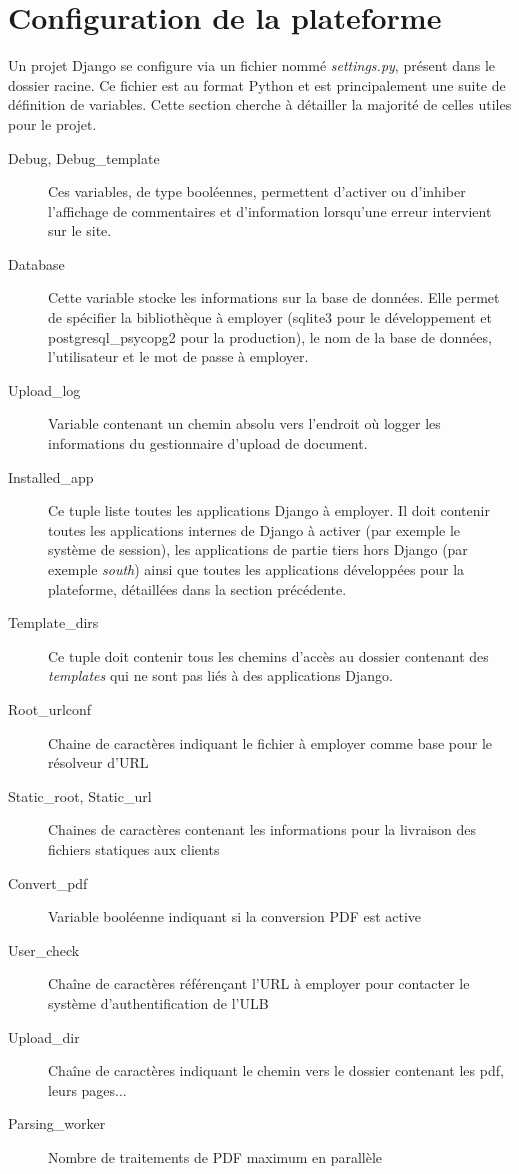 \documentclass[a4paper,12pt]{article}
\begin{document}
\section{Configuration de la plateforme}

Un projet Django se configure via un fichier nommé \textit{settings.py},
présent dans le dossier racine. Ce fichier est au format Python et est principalement
une suite de définition de variables. Cette section cherche à détailler la majorité
de celles utiles pour le projet.

\begin{description}
\item[Debug, Debug\_template] Ces variables, de type booléennes, permettent d'activer
      ou d'inhiber l'affichage de commentaires et d'information lorsqu'une erreur
      intervient sur le site.
\item[Database] Cette variable stocke les informations sur la base de données. Elle
      permet de spécifier la bibliothèque à employer (sqlite3 pour le développement
      et postgresql\_psycopg2 pour la production), le nom de la base de données, l'utilisateur
      et le mot de passe à employer.
\item[Upload\_log] Variable contenant un chemin absolu vers l'endroit où logger
      les informations du gestionnaire d'upload de document.
\item[Installed\_app] Ce tuple liste toutes les applications Django à employer. Il
      doit contenir toutes les applications internes de Django à activer (par exemple
      le système de session), les applications de partie tiers hors Django (par exemple
      \textit{south}) ainsi que toutes les applications développées pour la plateforme,
      détaillées dans la section précédente.
\item[Template\_dirs] Ce tuple doit contenir tous les chemins d'accès au dossier
      contenant des \textit{templates} qui ne sont pas liés à des applications Django.
\item[Root\_urlconf] Chaine de caractères indiquant le fichier à employer comme
      base pour le résolveur d'URL
\item[Static\_root, Static\_url] Chaines de caractères contenant les informations
      pour la livraison des fichiers statiques aux clients
\item[Convert\_pdf] Variable booléenne indiquant si la conversion PDF est active
\item[User\_check] Chaîne de caractères référençant l'URL à employer pour contacter
      le système d'authentification de l'ULB
\item[Upload\_dir] Chaîne de caractères indiquant le chemin vers le dossier contenant
      les pdf, leurs pages...
\item[Parsing\_worker] Nombre de traitements de PDF maximum en parallèle
\end{description}
\end{document}
